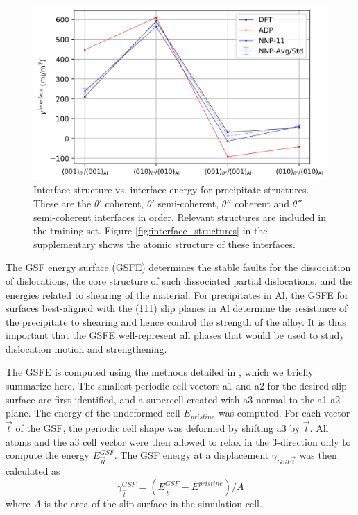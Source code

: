 \documentclass{article}
\begin{document}
\begin{figure}[H]%
\centering%
\includegraphics[width=1\textwidth,center]{./figures/interface_energies.png}%
\caption{Interface structure vs. interface energy for precipitate structures. 
These are the $\theta'$ coherent, $\theta'$ semi-coherent, $\theta''$ coherent and $\theta''$ semi-coherent
interfaces in order. Relevant structures are included in the training set. 
Figure \ref{fig:interface_structures} in the supplementary shows the atomic structure of these interfaces.
}%
\label{fig:interface_energies}
\end{figure}

The GSF energy surface (GSFE) determines the stable faults for the dissociation of dislocations, the core structure of such dissociated partial dislocations, and the energies related to shearing of the material.  For precipitates in Al, the GSFE for surfaces best-aligned with the (111) slip planes in Al determine the resistance of the precipitate to shearing and hence control the strength of the alloy.  It is thus important that the GSFE well-represent all phases that would be used to study dislocation motion and strengthening.  

The GSFE is computed using the methods detailed in \cite{Yin2017a}, which we briefly summarize here.
The smallest periodic cell vectors a1 and a2 for the desired slip surface are first identified, and a supercell created with a3 normal to the a1-a2 plane.  The  energy of the undeformed cell $E_{pristine}$ was computed.
For each vector $\vec{t}$ of the GSF, the periodic cell shape was deformed by shifting a3 by $\vec{t}$.  All atoms and the a3 cell vector were then allowed to relax in the 3-direction only to compute the energy $E^{GSF}_{\vec{R}}$.
The GSF energy at a displacement $\gamma_{GSF\vec{t}}$ was then calculated as 
\begin{equation}
\gamma^{GSF}_{\vec{t}} = (E^{GSF}_{\vec{t}} - E^{pristine})/A
\end{equation}
where $A$ is the area of the slip surface in the simulation cell.
\end{document}
